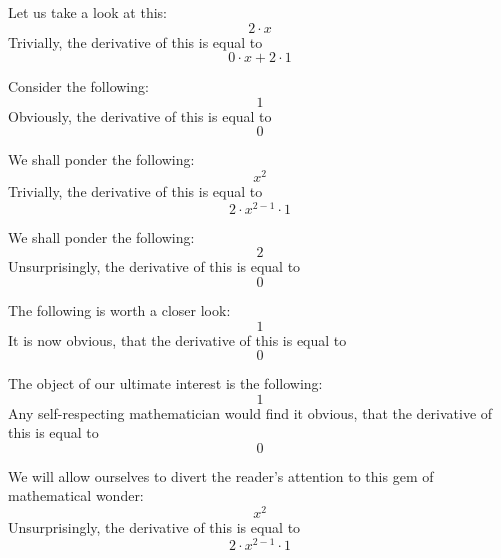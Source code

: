 \documentclass{article}
\begin{document}
Let us take a look at this:
\begin{equation}
2 \cdot x 
\end{equation}
Trivially, the derivative of this is equal to
\begin{equation}
0 \cdot x + 2 \cdot 1 
\end{equation}

Consider the following:
\begin{equation}
1 
\end{equation}
Obviously, the derivative of this is equal to
\begin{equation}
0 
\end{equation}

We shall ponder the following:
\begin{equation}
x ^{2 } 
\end{equation}
Trivially, the derivative of this is equal to
\begin{equation}
2 \cdot x ^{2 - 1 } \cdot 1 
\end{equation}

We shall ponder the following:
\begin{equation}
2 
\end{equation}
Unsurprisingly, the derivative of this is equal to
\begin{equation}
0 
\end{equation}

The following is worth a closer look:
\begin{equation}
1 
\end{equation}
It is now obvious, that the derivative of this is equal to
\begin{equation}
0 
\end{equation}

The object of our ultimate interest is the following:
\begin{equation}
1 
\end{equation}
Any self-respecting mathematician would find it obvious, that the derivative of this is equal to
\begin{equation}
0 
\end{equation}

We will allow ourselves to divert the reader's attention to this gem of mathematical wonder:
\begin{equation}
x ^{2 } 
\end{equation}
Unsurprisingly, the derivative of this is equal to
\begin{equation}
2 \cdot x ^{2 - 1 } \cdot 1 
\end{equation}
\end{document}
